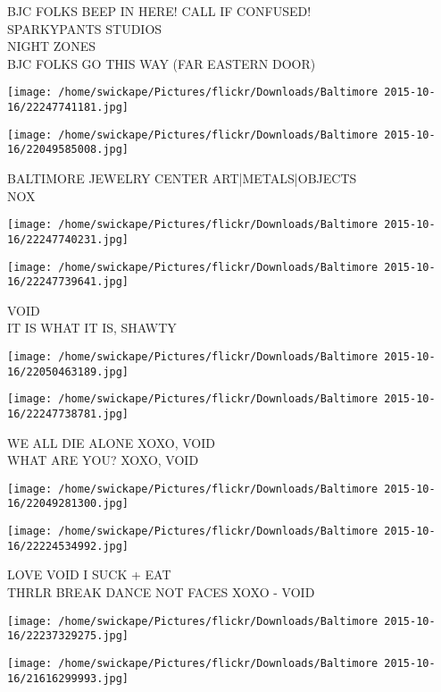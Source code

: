 \documentclass[10pt,letterpaper]{article}
\begin{document}
BJC FOLKS BEEP IN HERE! CALL IF CONFUSED!\\
SPARKYPANTS STUDIOS\\
NIGHT ZONES\\
BJC FOLKS GO THIS WAY (FAR EASTERN DOOR)
\pagebreak

\texttt{[image: /home/swickape/Pictures/flickr/Downloads/Baltimore 2015-10-16/22247741181.jpg]}

\vspace{0.25in}
\texttt{[image: /home/swickape/Pictures/flickr/Downloads/Baltimore 2015-10-16/22049585008.jpg]}

BALTIMORE JEWELRY CENTER ART|METALS|OBJECTS\\
NOX
\pagebreak

\texttt{[image: /home/swickape/Pictures/flickr/Downloads/Baltimore 2015-10-16/22247740231.jpg]}

\vspace{0.25in}
\texttt{[image: /home/swickape/Pictures/flickr/Downloads/Baltimore 2015-10-16/22247739641.jpg]}

VOID\\
IT IS WHAT IT IS, SHAWTY
\pagebreak

\texttt{[image: /home/swickape/Pictures/flickr/Downloads/Baltimore 2015-10-16/22050463189.jpg]}

\vspace{0.25in}
\texttt{[image: /home/swickape/Pictures/flickr/Downloads/Baltimore 2015-10-16/22247738781.jpg]}

WE ALL DIE ALONE XOXO, VOID\\
WHAT ARE YOU?  XOXO, VOID
\pagebreak

\texttt{[image: /home/swickape/Pictures/flickr/Downloads/Baltimore 2015-10-16/22049281300.jpg]}

\vspace{0.25in}
\texttt{[image: /home/swickape/Pictures/flickr/Downloads/Baltimore 2015-10-16/22224534992.jpg]}

LOVE VOID I SUCK + EAT\\
THRLR BREAK DANCE NOT FACES XOXO {-} VOID
\pagebreak

\texttt{[image: /home/swickape/Pictures/flickr/Downloads/Baltimore 2015-10-16/22237329275.jpg]}

\vspace{0.25in}
\texttt{[image: /home/swickape/Pictures/flickr/Downloads/Baltimore 2015-10-16/21616299993.jpg]}
\end{document}
